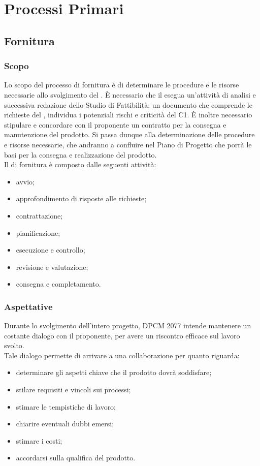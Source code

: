 \section{Processi Primari}
	\subsection{Fornitura}
		\subsubsection{Scopo}
		Lo scopo del processo di fornitura è di determinare le procedure e le risorse necessarie allo
		svolgimento del . È necessario che il  esegua un'attività di analisi e successiva redazione dello Studio di Fattibilità: un documento che comprende le richieste del , individua i potenziali rischi e criticità del C1.
		È inoltre necessario stipulare e concordare con il proponente un contratto per la consegna e manutenzione del prodotto. 
		Si passa dunque alla determinazione delle procedure e risorse necessarie, che andranno a confluire nel Piano di Progetto che porrà le basi per la consegna e realizzazione del prodotto.
		\\
		Il  di fornitura è composto dalle seguenti attività:
		\begin{itemize}
			\item avvio;
			\item approfondimento di risposte alle richieste;
			\item contrattazione;
			\item pianificazione;
			\item esecuzione e controllo;
			\item revisione e valutazione;
			\item consegna e completamento.
		\end{itemize}
		\subsubsection{Aspettative}
		Durante lo svolgimento dell'intero progetto, DPCM 2077 intende mantenere un costante dialogo con il proponente, per avere un riscontro efficace sul lavoro svolto.
		\\
		Tale dialogo permette di arrivare a una collaborazione per quanto riguarda:
		\begin{itemize}
			\item determinare gli aspetti chiave che il prodotto dovrà soddisfare;
			\item stilare requisiti e vincoli sui processi;
			\item stimare le tempistiche di lavoro;
			\item chiarire eventuali dubbi emersi;
			\item stimare i costi;
			\item accordarsi sulla qualifica del prodotto.
		\end{itemize}
